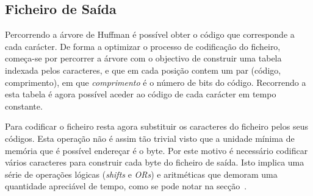 \subsection{Ficheiro de Saída}

Percorrendo a árvore de Huffman é possível obter o código que corresponde a cada carácter. De forma a optimizar o processo de codificação do ficheiro, começa-se por percorrer a árvore com o objectivo de construir uma tabela indexada pelos caracteres, e que em cada posição contem um par (código, comprimento), em que \emph{comprimento} é o número de bits do código. Recorrendo a esta tabela é agora possível aceder ao código de cada carácter em tempo constante.

Para codificar o ficheiro resta agora substituir os caracteres do ficheiro pelos seus códigos. Esta operação não é assim tão trivial visto que a unidade mínima de memória que é possível endereçar é o byte. Por este motivo é necessário codificar vários caracteres para construir cada byte do ficheiro de saída. Isto implica uma série de operações lógicas (\textit{shifts} e \textit{ORs}) e aritméticas que demoram uma quantidade apreciável de tempo, como se pode notar na secção~.
